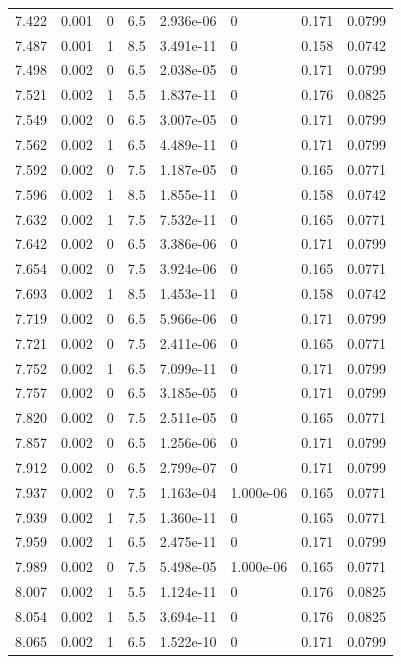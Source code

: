 \documentclass[preview]{standalone}
\begin{document}
{{{{{{{{\begin{tabular}{L{1.2cm}C{1.2cm} C{0.3cm}C{0.5cm} C{1.4cm}C{1.4cm} C{1.4cm}C{1.4cm}}
  7.422  &  0.001  & 0     & 6.5 &  2.936e-06  & 0  & 0.171 &  0.0799   \\ 
  7.487  &  0.001  & 1     & 8.5 &  3.491e-11  & 0  & 0.158 &  0.0742   \\ 
  7.498  &  0.002  & 0     & 6.5 &  2.038e-05  & 0  & 0.171 &  0.0799   \\ 
  7.521  &  0.002  & 1     & 5.5 &  1.837e-11  & 0  & 0.176 &  0.0825   \\ 
  7.549  &  0.002  & 0     & 6.5 &  3.007e-05  & 0  & 0.171 &  0.0799   \\ 
  7.562  &  0.002  & 1     & 6.5 &  4.489e-11  & 0  & 0.171 &  0.0799   \\ 
  7.592  &  0.002  & 0     & 7.5 &  1.187e-05  & 0  & 0.165 &  0.0771   \\ 
  7.596  &  0.002  & 1     & 8.5 &  1.855e-11  & 0  & 0.158 &  0.0742   \\ 
  7.632  &  0.002  & 1     & 7.5 &  7.532e-11  & 0  & 0.165 &  0.0771   \\ 
  7.642  &  0.002  & 0     & 6.5 &  3.386e-06  & 0  & 0.171 &  0.0799   \\ 
  7.654  &  0.002  & 0     & 7.5 &  3.924e-06  & 0  & 0.165 &  0.0771   \\ 
  7.693  &  0.002  & 1     & 8.5 &  1.453e-11  & 0  & 0.158 &  0.0742   \\ 
  7.719  &  0.002  & 0     & 6.5 &  5.966e-06  & 0  & 0.171 &  0.0799   \\ 
  7.721  &  0.002  & 0     & 7.5 &  2.411e-06  & 0  & 0.165 &  0.0771   \\ 
  7.752  &  0.002  & 1     & 6.5 &  7.099e-11  & 0  & 0.171 &  0.0799   \\ 
  7.757  &  0.002  & 0     & 6.5 &  3.185e-05  & 0  & 0.171 &  0.0799   \\ 
  7.820  &  0.002  & 0     & 7.5 &  2.511e-05  & 0  & 0.165 &  0.0771   \\ 
  7.857  &  0.002  & 0     & 6.5 &  1.256e-06  & 0  & 0.171 &  0.0799   \\ 
  7.912  &  0.002  & 0     & 6.5 &  2.799e-07  & 0  & 0.171 &  0.0799   \\ 
  7.937  &  0.002  & 0     & 7.5 &  1.163e-04  & 1.000e-06  & 0.165 &  0.0771   \\ 
  7.939  &  0.002  & 1     & 7.5 &  1.360e-11  & 0  & 0.165 &  0.0771   \\ 
  7.959  &  0.002  & 1     & 6.5 &  2.475e-11  & 0  & 0.171 &  0.0799   \\ 
  7.989  &  0.002  & 0     & 7.5 &  5.498e-05  & 1.000e-06  & 0.165 &  0.0771   \\ 
  8.007  &  0.002  & 1     & 5.5 &  1.124e-11  & 0  & 0.176 &  0.0825   \\ 
  8.054  &  0.002  & 1     & 5.5 &  3.694e-11  & 0  & 0.176 &  0.0825   \\ 
  8.065  &  0.002  & 1     & 6.5 &  1.522e-10  & 0  & 0.171 &  0.0799   \\ 
\hline 
\end{tabular} 

}}}}}}}}
\end{document}
